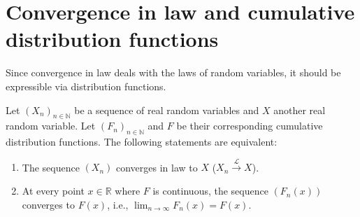 \section{Convergence in law and cumulative distribution functions}%
Since convergence in law deals with the laws of random variables, it should be expressible via distribution functions.%
\begin{theorem}
Let $(X_n)_{n \in \mathbb{N}}$ be a sequence of real random variables and $X$ another real random variable. Let $(F_n)_{n \in \mathbb{N}}$ and $F$ be their corresponding cumulative distribution functions. The following statements are equivalent:
\begin{enumerate}
    \item[i)] The sequence $(X_n)$ converges in law to $X$ ($X_n \xrightarrow{\mathcal{L}} X$).
\item[ii)] At every point $x \in \mathbb{R}$ where $F$ is continuous, the sequence $(F_n(x))$ converges to $F(x)$, i.e., $\lim_{n \to \infty} F_n(x) = F(x)$.
\end{enumerate}
\end{theorem}%
